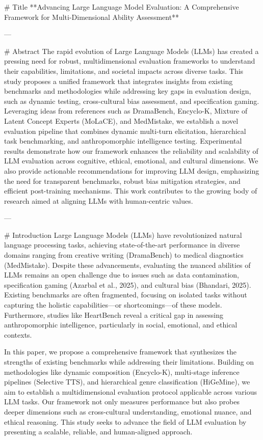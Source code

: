 # Title  
**Advancing Large Language Model Evaluation: A Comprehensive Framework for Multi-Dimensional Ability Assessment**

---

# Abstract  
The rapid evolution of Large Language Models (LLMs) has created a pressing need for robust, multidimensional evaluation frameworks to understand their capabilities, limitations, and societal impacts across diverse tasks. This study proposes a unified framework that integrates insights from existing benchmarks and methodologies while addressing key gaps in evaluation design, such as dynamic testing, cross-cultural bias assessment, and specification gaming. Leveraging ideas from references such as DramaBench, Encyclo-K, Mixture of Latent Concept Experts (MoLaCE), and MedMistake, we establish a novel evaluation pipeline that combines dynamic multi-turn elicitation, hierarchical task benchmarking, and anthropomorphic intelligence testing. Experimental results demonstrate how our framework enhances the reliability and scalability of LLM evaluation across cognitive, ethical, emotional, and cultural dimensions. We also provide actionable recommendations for improving LLM design, emphasizing the need for transparent benchmarks, robust bias mitigation strategies, and efficient post-training mechanisms. This work contributes to the growing body of research aimed at aligning LLMs with human-centric values.

---

# Introduction  
Large Language Models (LLMs) have revolutionized natural language processing tasks, achieving state-of-the-art performance in diverse domains ranging from creative writing (DramaBench) to medical diagnostics (MedMistake). Despite these advancements, evaluating the nuanced abilities of LLMs remains an open challenge due to issues such as data contamination, specification gaming (Azarbal et al., 2025), and cultural bias (Bhandari, 2025). Existing benchmarks are often fragmented, focusing on isolated tasks without capturing the holistic capabilities—or shortcomings—of these models. Furthermore, studies like HeartBench reveal a critical gap in assessing anthropomorphic intelligence, particularly in social, emotional, and ethical contexts.

In this paper, we propose a comprehensive framework that synthesizes the strengths of existing benchmarks while addressing their limitations. Building on methodologies like dynamic composition (Encyclo-K), multi-stage inference pipelines (Selective TTS), and hierarchical genre classification (HiGeMine), we aim to establish a multidimensional evaluation protocol applicable across various LLM tasks. Our framework not only measures performance but also probes deeper dimensions such as cross-cultural understanding, emotional nuance, and ethical reasoning. This study seeks to advance the field of LLM evaluation by presenting a scalable, reliable, and human-aligned approach.

